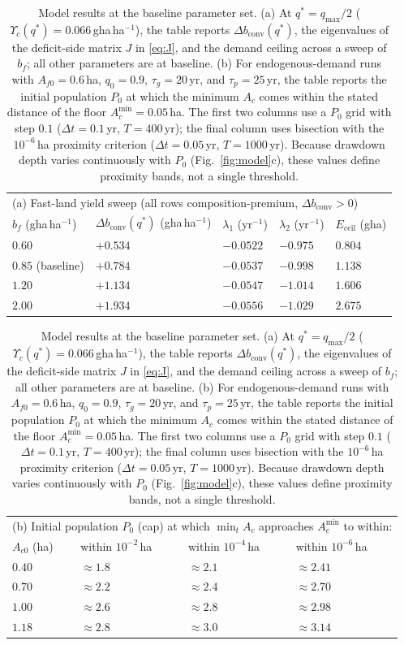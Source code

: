 \documentclass[preprint,12pt,authoryear]{elsarticle}
\newcommand{\dconv}{\Delta b_{\mathrm{conv}}}
\newcommand{\Ups}{\Upsilon_c}
\newcommand{\Eceil}{E_{\mathrm{ceil}}}
\newcommand{\Acmin}{A_c^{\min}}
\begin{document}
\begin{table}[!htbp]
\centering\small
\caption{Model results at the baseline parameter set. (a) At $q^*=q_{\max}/2$ ($\Ups(q^*)=0.066$\,gha\,ha$^{-1}$), the table reports $\dconv(q^*)$, the eigenvalues of the deficit-side matrix $J$ in \eqref{eq:J}, and the demand ceiling across a sweep of $b_f$; all other parameters are at baseline. (b) For endogenous-demand runs with $A_{f0}=0.6$\,ha, $q_0=0.9$, $\tau_g=20$\,yr, and $\tau_p=25$\,yr, the table reports the initial population $P_0$ at which the minimum $A_c$ comes within the stated distance of the floor $\Acmin=0.05$\,ha. The first two columns use a $P_0$ grid with step $0.1$ ($\Delta t=0.1$\,yr, $T=400$\,yr); the final column uses bisection with the $10^{-6}$\,ha proximity criterion ($\Delta t=0.05$\,yr, $T=1000$\,yr). Because drawdown depth varies continuously with $P_0$ (Fig.~\ref{fig:model}c), these values define proximity bands, not a single threshold.}
\label{tab:model}
\begin{tabular}{l l l l l}
\toprule
\multicolumn{5}{l}{(a) Fast-land yield sweep (all rows composition-premium, $\dconv>0$)}\\
$b_f$ (gha\,ha$^{-1}$) & $\dconv(q^*)$ (gha\,ha$^{-1}$) & $\lambda_1$ (yr$^{-1}$) & $\lambda_2$ (yr$^{-1}$) & $\Eceil$ (gha) \\
\midrule
$0.60$ & $+0.534$ & $-0.0522$ & $-0.975$ & $0.804$ \\
$0.85$ (baseline) & $+0.784$ & $-0.0537$ & $-0.998$ & $1.138$ \\
$1.20$ & $+1.134$ & $-0.0547$ & $-1.014$ & $1.606$ \\
$2.00$ & $+1.934$ & $-0.0556$ & $-1.029$ & $2.675$ \\
\bottomrule
\end{tabular}

\medskip
\begin{tabular}{l l l l}
\toprule
\multicolumn{4}{l}{(b) Initial population $P_0$ (cap) at which $\min_tA_c$ approaches $\Acmin$ to within:}\\ 
$A_{c0}$ (ha) & within $10^{-2}$\,ha & within $10^{-4}$\,ha & within $10^{-6}$\,ha \\
\midrule
$0.40$ & $\approx1.8$ & $\approx2.1$ & $\approx2.41$ \\
$0.70$ & $\approx2.2$ & $\approx2.4$ & $\approx2.70$ \\
$1.00$ & $\approx2.6$ & $\approx2.8$ & $\approx2.98$ \\
$1.18$ & $\approx2.8$ & $\approx3.0$ & $\approx3.14$ \\
\bottomrule
\end{tabular}
\end{table}
\end{document}
